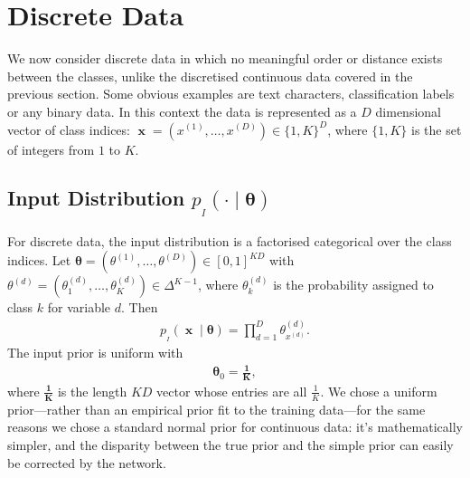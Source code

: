 \documentclass[11pt,table]{article}
\DeclareMathOperator{\x}{\mathbf{x}}
\newcommand{\tidx}[2]{#1_{#2}}
\newcommand{\didx}[2]{#1^{(#2)}}
\renewcommand{\vec}[1]{\boldsymbol{#1}}
\newcommand{\pars}{\theta}
\newcommand{\parsn}{\vec{\pars}}
\newcommand{\parsnt}[1]{\tidx{\parsn}{#1}}
\newcommand{\0}[1]{\constvec{0}{#1}}
\newcommand{\1}[1]{\constvec{1}{#1}}
\newcommand{\parsdd}[1]{\didx{\pars}{#1}}
\newcommand{\ds}[1]{\{1,#1\}}
\newcommand{\dsd}[2]{\ds{#1}^{#2}}
\newcommand{\inp}{p_{_I}}
\begin{document}
\section{Discrete Data}\label{sec:discrete}
We now consider discrete data in which no meaningful order or distance exists between the classes, unlike the discretised continuous data covered in the previous section.
Some obvious examples are text characters, classification labels or any binary data. 
In this context the data is represented as a $D$ dimensional vector of class indices:  $\x = \left(\didx{x}{1},\dots, \didx{x}{D}\right) \in \dsd{K}{D}$, where $\ds{K}$ is the set of integers from $1$ to $K$.
\subsection{Input Distribution \texorpdfstring{$\inp(\cdot \mid \parsn)$}{}}\label{sec:disc_input}
For discrete data, the input distribution is a factorised categorical over the class indices.
Let $\parsn = \left(\parsdd{1},\dots,\parsdd{D}\right) \in [0,1]^{KD}$ with $\parsdd{d}= \left(\pars_1^{(d)},\dots,\pars_K^{(d)}\right) \in \Delta^{K-1}$, where $\pars_k^{(d)}$ is the probability assigned to class $k$ for variable $d$. 
Then
\begin{align}
\inp(\x \mid \parsn) = \prod_{d=1}^D  \pars_{\didx{x}{d}}^{(d)}.
\end{align}
The input prior is uniform with
\begin{align}
\parsnt{0} = \vec{\frac{1}{K}}\label{disc_input_prior},
\end{align}
where $\vec{\frac{1}{K}}$ is the length $KD$ vector whose entries are all $\frac{1}{K}$.
We chose a uniform prior---rather than an empirical prior fit to the training data---for the same reasons we chose a standard normal prior for continuous data: it's mathematically simpler, and the disparity between the true prior and the simple prior can easily be corrected by the network.
\end{document}
